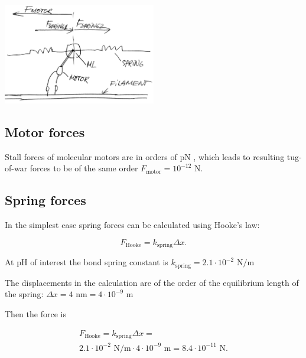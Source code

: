 \begin{center}
\includegraphics[width=0.5\textwidth]{D_chapters/6_appendix/Capsid.jpg}
\end{center}

\subsection{Motor forces}

Stall forces of molecular motors are in orders of pN \cite{muller2008tug}, which leads to resulting tug-of-war forces to be of the same order $F_{\text{motor}} = 10^{-12} \text{ N}$.

\subsection{Spring forces}

In the simplest case spring forces can be calculated using Hooke's law:

\begin{equation}
F_{\text{Hooke}} = k_{\text{spring}}\Delta x.
\end{equation}

At pH of interest the bond spring constant is $k_{\text{spring}} = 2.1 \cdot 10^{-2} \text{ N}/\text{m}$ \cite{li2014ph}

The displacements in the calculation are of the order of the equilibrium length of the spring: $\Delta x = 4 \text{ nm} = 4 \cdot 10^{-9} \text{ m}$

Then the force is

\begin{equation}
\begin{split}
F_{\text{Hooke}} = k_{\text{spring}}\Delta x =\\
2.1 \cdot 10^{-2} \text{ N}/\text{m} \cdot 4 \cdot 10^{-9} \text{ m} = 8.4 \cdot 10^{-11} \text{ N}.
\end{split}
\end{equation}


